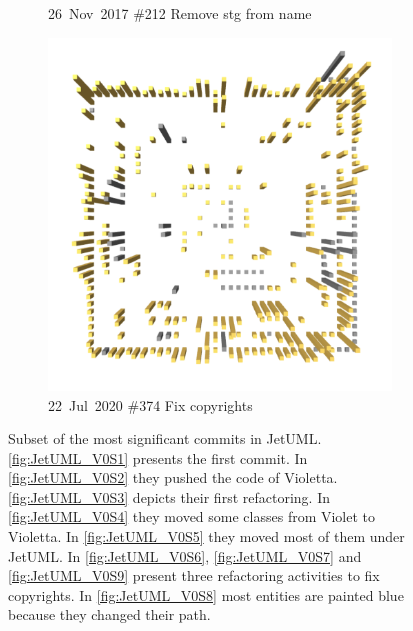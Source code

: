\begin{figure}[ht]
\begin{subfigure}{0.32\textwidth}
        \caption{\mbox{26 Nov 2017}  \hfill  \linebreak  \#212 Remove stg from name} 
        \label{fig:JetUML_V0S8}
    \end{subfigure}
    \hspace*{\fill}
    \begin{subfigure}{0.32\textwidth}
        \includegraphics[width=\linewidth]{JetUML_V0S9.png}
        \caption{\mbox{22 Jul 2020}  \hfill  \linebreak  \#374 Fix copyrights} 
        \label{fig:JetUML_V0S9}
    \end{subfigure}
    \hspace*{\fill}
    \medskip
    \caption{
        Subset of the most significant commits in JetUML. \autoref{fig:JetUML_V0S1} presents the first commit. In \autoref{fig:JetUML_V0S2} they pushed the code of Violetta. \autoref{fig:JetUML_V0S3} depicts their first refactoring. In \autoref{fig:JetUML_V0S4} they moved some classes from Violet to Violetta. In \autoref{fig:JetUML_V0S5} they moved most of them under JetUML. In \autoref{fig:JetUML_V0S6}, \autoref{fig:JetUML_V0S7} and \autoref{fig:JetUML_V0S9} present three refactoring activities to fix copyrights. In \autoref{fig:JetUML_V0S8} most entities are painted blue because they changed their path.} 
    \label{fig:JetUML_V0}
\end{figure}

